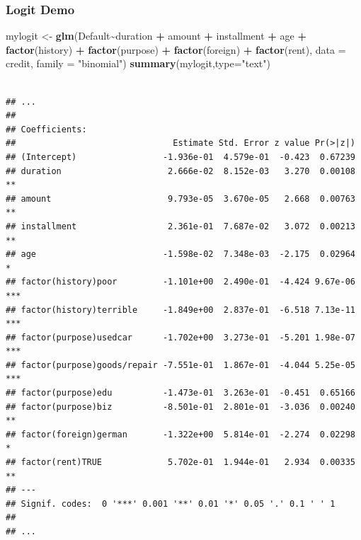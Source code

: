 \documentclass[
  shownotes,
  xcolor={svgnames},
  hyperref={colorlinks,citecolor=DarkBlue,linkcolor=DarkRed,urlcolor=DarkBlue}
  , aspectratio=169]{beamer}
\newenvironment{Shaded}{\begin{snugshade}}{\end{snugshade}}
\newcommand{\DataTypeTok}[1]{\textcolor[rgb]{0.13,0.29,0.53}{#1}}
\newcommand{\KeywordTok}[1]{\textcolor[rgb]{0.13,0.29,0.53}{\textbf{#1}}}
\newcommand{\NormalTok}[1]{#1}
\newcommand{\OperatorTok}[1]{\textcolor[rgb]{0.81,0.36,0.00}{\textbf{#1}}}
\newcommand{\StringTok}[1]{\textcolor[rgb]{0.31,0.60,0.02}{#1}}
\begin{document}
\begin{frame}[fragile]
\frametitle{Logit Demo}

\begin{scriptsize}
\begin{Shaded}
\begin{Highlighting}[]
\NormalTok{mylogit \textless{}{-}}\StringTok{ }\KeywordTok{glm}\NormalTok{(Default}\OperatorTok{\textasciitilde{}}\NormalTok{duration }\OperatorTok{+}\StringTok{ }\NormalTok{amount }\OperatorTok{+}\StringTok{ }\NormalTok{installment }\OperatorTok{+}\StringTok{ }\NormalTok{age }\OperatorTok{+}
                      \StringTok{ }\KeywordTok{factor}\NormalTok{(history) }\OperatorTok{+}\StringTok{ }\KeywordTok{factor}\NormalTok{(purpose) }\OperatorTok{+}\StringTok{ }\KeywordTok{factor}\NormalTok{(foreign) }\OperatorTok{+}\StringTok{ }\KeywordTok{factor}\NormalTok{(rent), }
                       \DataTypeTok{data =}\NormalTok{ credit, }\DataTypeTok{family =} \StringTok{"binomial"}\NormalTok{)}
\KeywordTok{summary}\NormalTok{(mylogit,}\DataTypeTok{type=}\StringTok{"text"}\NormalTok{)}
\end{Highlighting}
\end{Shaded}
\end{scriptsize}

\begin{tiny}
\begin{verbatim}

## ...
## 
## Coefficients:
##                               Estimate Std. Error z value Pr(>|z|)    
## (Intercept)                 -1.936e-01  4.579e-01  -0.423  0.67239    
## duration                     2.666e-02  8.152e-03   3.270  0.00108 ** 
## amount                       9.793e-05  3.670e-05   2.668  0.00763 ** 
## installment                  2.361e-01  7.687e-02   3.072  0.00213 ** 
## age                         -1.598e-02  7.348e-03  -2.175  0.02964 *  
## factor(history)poor         -1.101e+00  2.490e-01  -4.424 9.67e-06 ***
## factor(history)terrible     -1.849e+00  2.837e-01  -6.518 7.13e-11 ***
## factor(purpose)usedcar      -1.702e+00  3.273e-01  -5.201 1.98e-07 ***
## factor(purpose)goods/repair -7.551e-01  1.867e-01  -4.044 5.25e-05 ***
## factor(purpose)edu          -1.473e-01  3.263e-01  -0.451  0.65166    
## factor(purpose)biz          -8.501e-01  2.801e-01  -3.036  0.00240 ** 
## factor(foreign)german       -1.322e+00  5.814e-01  -2.274  0.02298 *  
## factor(rent)TRUE             5.702e-01  1.944e-01   2.934  0.00335 ** 
## ---
## Signif. codes:  0 '***' 0.001 '**' 0.01 '*' 0.05 '.' 0.1 ' ' 1
## 
## ...
\end{verbatim}
\end{tiny}
\end{frame}
\end{document}
